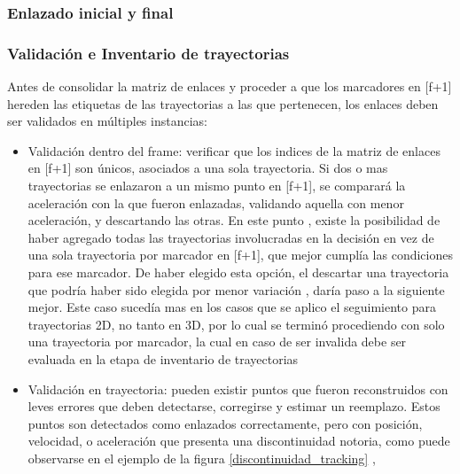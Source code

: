 \subsubsection{Enlazado inicial y final}



\subsubsection{Validación e Inventario de trayectorias}

Antes de consolidar la matriz de enlaces y proceder a que los marcadores en [f+1] hereden las etiquetas de las trayectorias a las que pertenecen, los enlaces deben ser validados en múltiples instancias:

\begin{itemize}
\item Validación dentro del frame: verificar que los indices de la matriz de enlaces en [f+1] son únicos, asociados a una sola trayectoria. Si dos o mas trayectorias se enlazaron a un mismo punto en [f+1], se comparará la aceleración con la que fueron enlazadas, validando aquella con menor aceleración, y descartando las otras. En este punto , existe la posibilidad de haber agregado todas las trayectorias involucradas en la decisión en vez de una sola trayectoria por marcador en [f+1], que mejor cumplía las condiciones para ese marcador. De haber elegido esta opción, el descartar una trayectoria que podría haber sido elegida por menor variación , daría paso a la siguiente mejor. Este caso sucedía mas en los casos que se aplico el seguimiento para trayectorias 2D, no tanto en 3D, por lo cual se terminó procediendo con solo una trayectoria por marcador, la cual en caso de ser invalida debe ser evaluada en la etapa de inventario de trayectorias  
\item Validación en trayectoria: pueden existir puntos que fueron reconstruidos con leves errores que deben detectarse, corregirse y estimar un reemplazo. Estos puntos son detectados como enlazados correctamente, pero con posición, velocidad, o aceleración que presenta una discontinuidad notoria, como puede observarse en el ejemplo de la figura \ref{discontinuidad_tracking} ,


\end{itemize}
